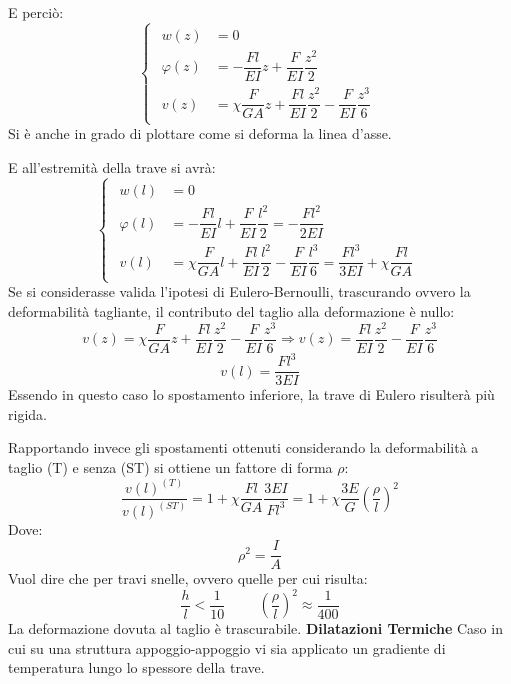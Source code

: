 \documentclass{article}
\begin{document}
\begin{adjustwidth}{2in}{}
		E perciò:
		\[ 
		\begin{cases}
			\begin{aligned}
				w(z) & = 0 \\
				\varphi(z) & = -\dfrac{Fl}{EI}z + \dfrac{F}{EI} \dfrac{z^2}{2} \\
				v(z) & = \chi\dfrac{F}{GA}z + \dfrac{Fl}{EI} \dfrac{z^2}{2}  - \dfrac{F}{EI} \dfrac{z^3}{6}  				
			\end{aligned}
		\end{cases}
		\]
		Si è anche in grado di plottare come si deforma la linea d'asse. \newline 
		
		E all'estremità della trave si avrà: 
		\[ 
		\begin{cases}
			\begin{aligned}
				w(l) & =  0\\
				\varphi(l) & = -\dfrac{Fl}{EI}l + \dfrac{F}{EI} \dfrac{l^2}{2} =- \dfrac{Fl^2}{2EI}\\
				v(l) & = \chi\dfrac{F}{GA}l + \dfrac{Fl}{EI} \dfrac{l^2}{2}  - \dfrac{F}{EI} \dfrac{l^3}{6} = \dfrac{Fl^3}{3EI} + \chi\dfrac{Fl}{GA}				
			\end{aligned}
		\end{cases}
		\]
		Se si considerasse valida l’ipotesi di Eulero-Bernoulli, trascurando ovvero la deformabilità tagliante, il contributo
		del taglio alla deformazione è nullo:
		\[ v(z) = \chi\dfrac{F}{GA}z + \dfrac{Fl}{EI} \dfrac{z^2}{2} - \dfrac{F}{EI} \dfrac{z^3}{6} \Rightarrow v(z) = \dfrac{Fl}{EI} \dfrac{z^2}{2} - \dfrac{F}{EI} \dfrac{z^3}{6} \]
		\[ v(l) = \dfrac{Fl^3}{3EI} \]
		Essendo in questo caso lo spostamento inferiore, la trave di Eulero risulterà più rigida.\newline 
		
		Rapportando invece gli spostamenti ottenuti considerando la deformabilità a taglio (T) e senza (ST) si ottiene un fattore di forma $\rho$:
		\[\dfrac{v(l)^{(T)}}{v(l)^{(ST)}} = 1 + \chi\dfrac{Fl}{GA}\dfrac{3EI}{Fl^3} = 1+ \chi\dfrac{3E}{G} \left( \dfrac{\rho}{l}\right)^2 \]
		Dove: 
		\[ \rho^2 = \dfrac{I}{A} \]
		Vuol dire che per travi snelle, ovvero quelle per cui risulta:
		\[\dfrac{h}{l} < \dfrac{1}{10} \hspace{1cm} \left( \dfrac{\rho}{l}\right)^2 \approx \dfrac{1}{400} \]
		La deformazione dovuta al taglio è trascurabile. \newline 
\newpage		
{\Large \textbf{Dilatazioni Termiche}} \mbox{} \newline
		Caso in cui su una struttura appoggio-appoggio vi sia applicato un gradiente di temperatura lungo lo spessore della trave. \newline 
		

\end{adjustwidth}
\end{document}
